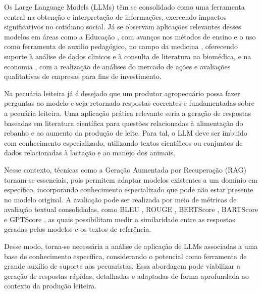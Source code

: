 Os Large Language Models (LLMs) têm se consolidado como uma ferramenta central na obtenção e interpretação de informações, exercendo impactos significativos no cotidiano social. Já se observam aplicações relevantes desses modelos em áreas como a Educação \cite{IAeChatGPT}, com avanços nos métodos de ensino e o uso como ferramenta de auxilio pedagógico, no campo da medicina \cite{ChatGPTInMedicice}, oferecendo suporte à análise de dados clinicos e à consulta de literatura na biomédica, e na economia \cite{EconomieAndLLM}, com a realização de análises do mercado de ações e avaliações qualitativas de empresas para fins de investimento.


Na pecuária leiteira já é desejado que um produtor agropecuário possa fazer perguntas ao modelo e seja retornado respostas coerentes e fundamentadas sobre a pecuária leiteira. Uma aplicação prática relevante seria a geração de respostas baseadas em literatura científica para questões relacionadas à alimentação do rebanho e ao aumento da produção de leite. Para tal, o LLM deve ser imbuido com conhecimento especializado, utilizando textos científicos ou conjuntos de dados relacionadas à lactação e ao manejo dos animais.


Nesse contexto, técnicas como a Geração Aumentada por Recuperação (RAG) \cite{RAG} tornam-se essenciais, pois permitem adaptar modelos existentes a um domínio em específico, incorporando conhecimento especializado que pode não estar presente no modelo original. A avaliação pode ser realizada por meio de métricas de avaliação textual consolidadas, como BLEU \cite{papineni-etal-2002-bleu}, ROUGE \cite{lin-2004-rouge}, BERTScore \cite{zhang2020bertscoreevaluatingtextgeneration}, BARTScore \cite{bartscore} e GPTScore \cite{fu2023gptscoreevaluatedesire}, as quais possibilitam medir a similaridade entre as respostas geradas pelos modelos e os textos de referência.


Desse modo, torna-se necessária a análise de aplicação de LLMs associadas a uma base de conhecimento específica, considerando o potencial como ferramenta de grande auxílio de suporte aos pecuaristas. Essa abordagem pode viabilizar a geração de respostas rápidas, detalhadas e adaptadas de forma aprofundada ao contexto da produção leiteira. 